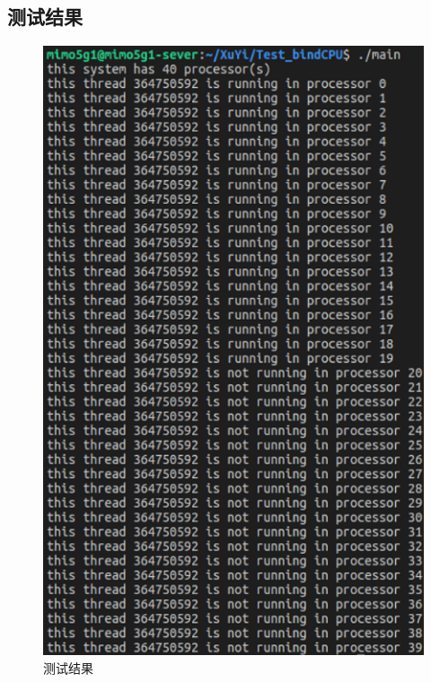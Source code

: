 \documentclass{article}
\begin{document}
\subsection{测试结果}
\begin{figure}[H]
	\centering
	\includegraphics[width = .6\textwidth]{testCPU.png}
	\caption{测试结果}
\end{figure}



\end{document}

